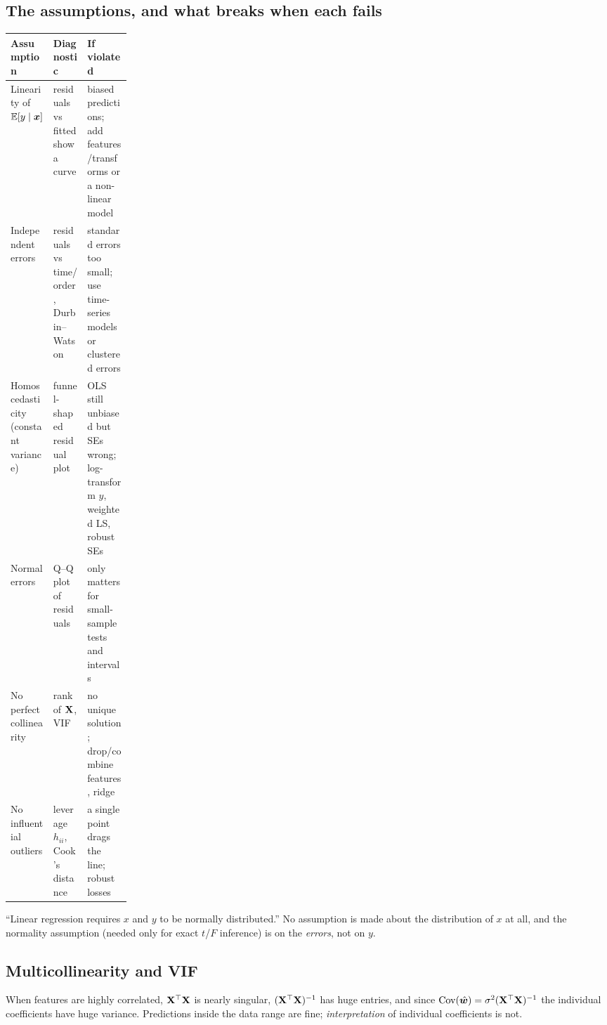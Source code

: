\subsection{The assumptions, and what breaks when each fails}
\begin{center}
	\small
	\begin{tabularx}{\linewidth}{>{\raggedright\arraybackslash}p{0.2\linewidth}
		>{\raggedright\arraybackslash}X >{\raggedright\arraybackslash}X}
		\toprule
		Assumption & Diagnostic & If violated \\
		\midrule
		Linearity of $\mathbb{E}[y\mid{\bm{x}}]$ & residuals vs fitted show a curve & biased predictions; add
		features/transforms or a non-linear model \\
		Independent errors & residuals vs time/order, Durbin--Watson & standard errors too small;
		use time-series models or clustered errors \\
		Homoscedasticity (constant variance) & funnel-shaped residual plot & OLS still unbiased but
		SEs wrong; log-transform $y$, weighted LS, robust SEs \\
		Normal errors & Q--Q plot of residuals & only matters for small-sample tests and intervals \\
		No perfect collinearity & rank of ${\mathbf{X}}$, VIF & no unique solution; drop/combine features,
		ridge \\
		No influential outliers & leverage $h_{ii}$, Cook's distance & a single point drags the
		line; robust losses \\
		\bottomrule
	\end{tabularx}
\end{center}

\begin{remark}
	\trap ``Linear regression requires $x$ and $y$ to be normally distributed.'' No assumption is
	made about the distribution of $x$ at all, and the normality assumption (needed only for exact
	$t$/$F$ inference) is on the \emph{errors}, not on $y$.
\end{remark}

\subsection{Multicollinearity and VIF}
When features are highly correlated, ${\mathbf{X}}^{\top}{\mathbf{X}}$ is nearly singular, $({\mathbf{X}}^{\top}{\mathbf{X}})^{-1}$ has huge entries,
and since $\operatorname{Cov}(\hat{{\bm{w}}})=\sigma^2({\mathbf{X}}^{\top}{\mathbf{X}})^{-1}$ the individual coefficients have huge variance.
Predictions inside the data range are fine; \emph{interpretation} of individual coefficients is
not.

